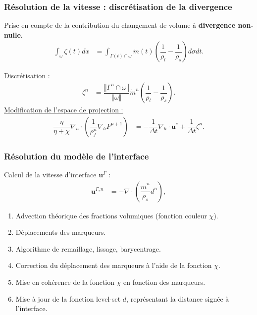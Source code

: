 \documentclass{beamer}
\newcommand{\inte}{\Gamma}
\newcommand{\vect}[1]{\bm{#1}}
\newcommand{\npl}{{n+1}}
\newcommand{\normeVec}[1]{\left\Vert #1\right\Vert}
\renewcommand{\frac}{\dfrac}
\begin{document}
\begin{frame}
    \frametitle{Résolution de la vitesse : discrétisation de la divergence}
    \footnotesize
        Prise en compte de la contribution du changement de volume à \textbf{divergence non-nulle}.\\
\begin{align}
	 \int_\omega \zeta (t) dx &= \int_{\inte (t) \cap \omega} \Dot{m}(t) \left( \frac{1}{\rho_l} - \frac{1}{\rho_s} \right) d\sigma dt.
\end{align}

\color{cea_rouge}\underline{Discrétisation :}\color{cea_texte}
\begin{align}
	\zeta^n &= \frac{\normeVec{\inte^n \cap \omega}}{\normeVec{\omega}}\Dot{m}^n \left( \frac{1}{\rho_l} - \frac{1}{\rho_s} \right).
\end{align}
\color{cea_rouge}\underline{Modification de l'espace de projection :}\color{cea_texte}
\begin{align}
	\label{eq:pression3}
	\frac{\eta}{\eta + \chi} \nabla_h \cdot \left( \frac{1}{\rho^n_f} \nabla_h P^\npl \right) &= -\frac{1}{\Delta t} \nabla_h \cdot \vect{u}^* + \frac{1}{\Delta t} \zeta^n.
\end{align}
\vspace{0.3cm}

\begin{center}
		\begin{tikzpicture}[scale = 0.55, every node/.style={scale=0.55}]
			
		\end{tikzpicture}
\end{center}
\end{frame}

\begin{frame}
    \frametitle{Résolution du modèle de l'interface}
    \footnotesize
Calcul de la vitesse d'interface $\vect{u}^\inte$ :
\begin{align}
	\label{eq:interfaceVitesse}
	\vect{u}^{\inte,n} &=  - \nabla \cdot \left( \frac{\Dot{m}^n}{\rho_s}d^n \right),
\end{align}
\begin{enumerate}
	\item Advection théorique  des fractions volumiques (fonction couleur $\chi$).
	\item Déplacements des marqueurs.
	\item Algorithme de remaillage, lissage, barycentrage.
	\item Correction du déplacement des marqueurs à l'aide de la fonction $\chi$.
	\item Mise en cohérence de la fonction $\chi$ en fonction des marqueurs.
	\item Mise à jour de la fonction level-set $d$, représentant la distance signée à l'interface.

\end{enumerate}
\end{frame}
\end{document}
